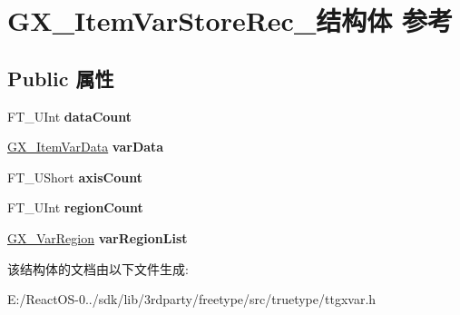 \hypertarget{struct_g_x___item_var_store_rec__}{}\section{G\+X\+\_\+\+Item\+Var\+Store\+Rec\+\_\+结构体 参考}
\label{struct_g_x___item_var_store_rec__}
\subsection*{Public 属性}
\begin{DoxyCompactItemize}
\item 
\mbox{\label{struct_g_x___item_var_store_rec___acb5c928af0e8030b74159f6116d53cce}} 
F\+T\+\_\+\+U\+Int {\bfseries data\+Count}
\item 
\mbox{\label{struct_g_x___item_var_store_rec___aacbc9c182dd88df83255cca3265b9602}} 
\hyperlink{struct_g_x___item_var_data_rec__}{G\+X\+\_\+\+Item\+Var\+Data} {\bfseries var\+Data}
\item 
\mbox{\label{struct_g_x___item_var_store_rec___a30b989adb89b1a0cbf064e1b9324d5c2}} 
F\+T\+\_\+\+U\+Short {\bfseries axis\+Count}
\item 
\mbox{\label{struct_g_x___item_var_store_rec___a263c3bd23eb0b6ff75a4dffacaf5867e}} 
F\+T\+\_\+\+U\+Int {\bfseries region\+Count}
\item 
\mbox{\label{struct_g_x___item_var_store_rec___ab50128f1722b555e1e9a85e9edac90d9}} 
\hyperlink{struct_g_x___var_region_rec__}{G\+X\+\_\+\+Var\+Region} {\bfseries var\+Region\+List}
\end{DoxyCompactItemize}


该结构体的文档由以下文件生成\+:\begin{DoxyCompactItemize}
\item 
E\+:/\+React\+O\+S-\/0../sdk/lib/3rdparty/freetype/src/truetype/ttgxvar.\+h\end{DoxyCompactItemize}
